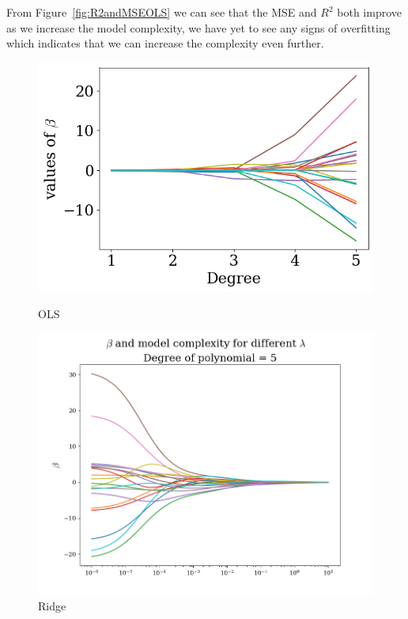 \documentclass[twoside,11pt]{report}
\begin{document}
From Figure~\ref{fig:R2andMSEOLS} we can see that the MSE and $R^2$ both improve as we increase the model complexity, we have yet to see any signs of overfitting which indicates that we can increase the complexity even further.

\begin{figure}[!h]
\begin{minipage}[t]{.48\linewidth}
    \begin{center}
        \includegraphics[width=1.0\textwidth]{../runsAndAdditions/betaOverOrderOLS.png}
        \caption{OLS}\label{fig:betaOverOrderOLS}
\end{center}
\end{minipage}
\hspace{4mm}
\begin{minipage}[t]{.48\linewidth}
    \begin{center}
        \includegraphics[width=1.0\textwidth]{../runsAndAdditions/BetaOverLambdaRidge5.png}
        \caption{Ridge}\label{fig:betaOverLambdaRidge5}
    \end{center}
\end{minipage}
\end{figure}
\end{document}
